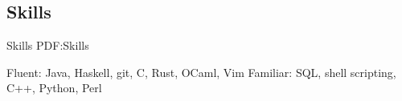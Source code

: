 \documentclass[letterpaper,10pt,oneside]{simpleresume}
\begin{document}
\begin{minipage}[t][0pt]{\linewidth}
\begin{body}




\section%
{Skills}
{Skills}
{PDF:Skills}

Fluent: Java, Haskell, git, C, Rust, OCaml, Vim
\GapNoBreak%
Familiar: SQL, shell scripting, C++, Python, Perl

\end{body}
\end{minipage}
\end{document}
